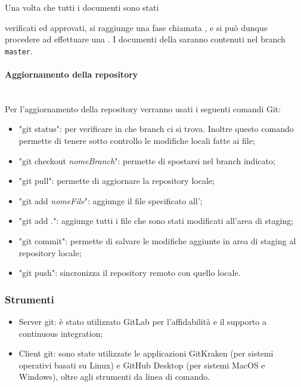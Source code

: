 Una volta che tutti i documenti sono stati {verificati ed approvati, si raggiunge una fase chiamata , e si può dunque procedere ad effettuare una . 
I documenti della saranno contenuti nel branch \texttt{master}.
\paragraph{Aggiornamento della repository}\mbox{}\\[0.4cm]
Per l’aggiornamento della repository verranno usati i seguenti comandi Git:
\begin{itemize}
    \item "git status": per verificare in che branch ci si trova. Inoltre questo    comando permette di tenere sotto controllo le modifiche locali fatte ai file;
    \item "git checkout \emph{nomeBranch}": permette di spostarsi nel branch indicato;
    \item "git pull": permette di aggiornare la repository locale;
    \item "git add \emph{nomeFile}": aggiunge il file specificato all';
    \item "git add .": aggiunge tutti i file che sono stati modificati all'area di staging;
    \item "git commit": permette di salvare le modifiche aggiunte in area di staging al repository locale;
    \item "git push": sincronizza il repository remoto con quello locale.
\end{itemize}
\subsubsection{Strumenti}
\begin{itemize}
    \item Server git: è stato utilizzato GitLab per l’affidabilità e il supporto a continuous integration;
    \item Client git: sono state utilizzate le applicazioni GitKraken (per sistemi operativi basati su Linux) e GitHub Desktop (per sistemi MacOS e Windows), oltre agli strumenti da linea di comando.
\end{itemize}
}
